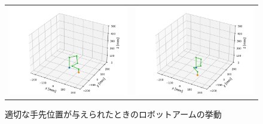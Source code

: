 \documentclass{ltjsarticle}
\begin{document}
\begin{figure}[H]
	\centering
	\begin{tabular}{cc}
		\begin{minipage}[c]{0.48\linewidth}
			\centering
			\includegraphics[width = 0.96\linewidth]{../results/program7_1.png}
			\subcaption{}
		\end{minipage}
		&
		\begin{minipage}[c]{0.48\linewidth}
			\centering
			\includegraphics[width = 0.96\linewidth]{../results/program7_2.png}
			\subcaption{}
		\end{minipage}
	\end{tabular}
	\caption{適切な手先位置が与えられたときのロボットアームの挙動}
	\label{fig:適切な手先位置が与えられたときのロボットアームの挙動}
\end{figure}
\end{document}

